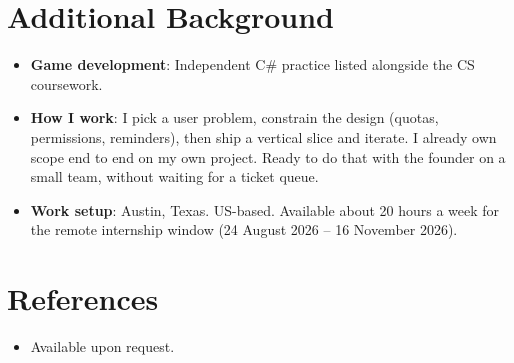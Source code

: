 \documentclass[11pt,a4paper,sans]{moderncv}
\begin{document}
\section{Additional Background}
\vspace{1pt}
\begin{itemize}

\item \textbf{Game development}: Independent C\# practice listed alongside the CS coursework.

\item \textbf{How I work}: I pick a user problem, constrain the design (quotas, permissions, reminders), then ship a vertical slice and iterate. I already own scope end to end on my own project. Ready to do that with the founder on a small team, without waiting for a ticket queue.

\item \textbf{Work setup}: Austin, Texas. US-based. Available about 20 hours a week for the remote internship window (24 August 2026 -- 16 November 2026).

\end{itemize}


\section{References}
\vspace{1pt}
\begin{itemize}
\item Available upon request.
\end{itemize}
\end{document}
